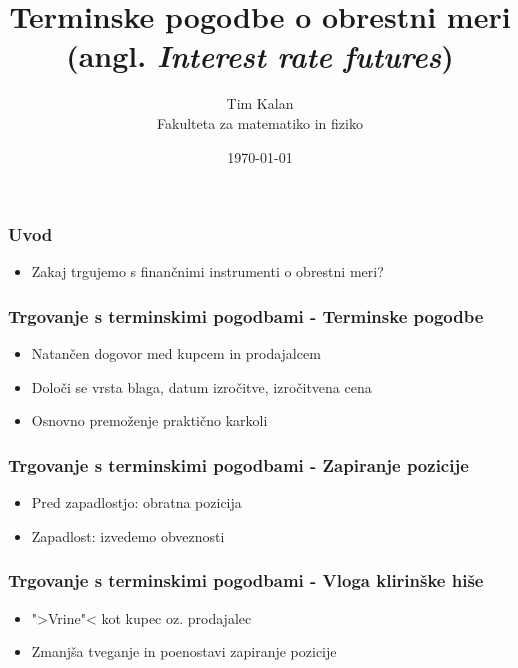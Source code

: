 \documentclass[14pt]{beamer}
\author{Tim Kalan \\ 
    Fakulteta za matematiko in fiziko}
\title{
    Terminske pogodbe o obrestni meri \\ 
    \large (angl. \textit{Interest rate futures})}
\date{\today}
\begin{document}
\begin{frame}
    \titlepage
\end{frame}

\begin{frame}
    \frametitle{Uvod}

    \begin{itemize}
        \item Zakaj trgujemo s finančnimi instrumenti o obrestni meri?
    \end{itemize}


\end{frame}


\begin{frame}
    \frametitle{Trgovanje s terminskimi pogodbami - Terminske pogodbe}
    
    \begin{itemize}
        \item Natančen dogovor med kupcem in prodajalcem
        \item Določi se vrsta blaga, datum izročitve, izročitvena cena
        \item Osnovno premoženje praktično karkoli 
    \end{itemize}


\end{frame}

\begin{frame}
    \frametitle{Trgovanje s terminskimi pogodbami - Zapiranje pozicije}
    
    \begin{itemize}
        \item Pred zapadlostjo: obratna pozicija
        \item Zapadlost: izvedemo obveznosti
    \end{itemize}


\end{frame}

\begin{frame}
    \frametitle{Trgovanje s terminskimi pogodbami - Vloga klirinške hiše}
    
    \begin{itemize}
        \item ">Vrine"< kot kupec oz. prodajalec
        \item Zmanjša tveganje in poenostavi zapiranje pozicije
    \end{itemize}


\end{frame}
\end{document}
